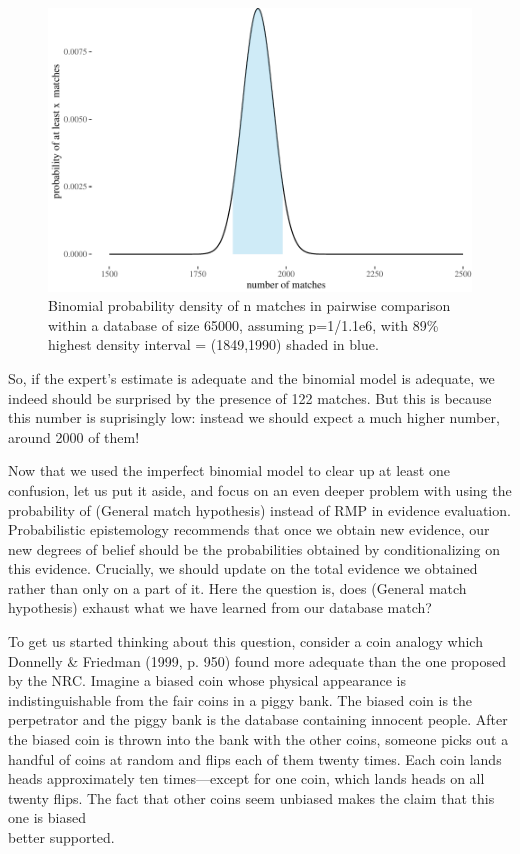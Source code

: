 \documentclass[10pt,dvipsnames,enabledeprecatedfontcommands]{scrartcl}
\begin{document}
\begin{figure}

{\centering \includegraphics[width=1\linewidth]{lr-chapter_files/figure-latex/unnamed-chunk-9-1} 

}

\caption{Binomial probability density of  n matches in pairwise comparison within a database of size 65000, assuming p=1/1.1e6, with 89\% highest density interval = (1849,1990) shaded in blue.}\label{fig:unnamed-chunk-9}
\end{figure}

So, if the expert's estimate is adequate and the binomial model is
adequate, we indeed should be surprised by the presence of 122 matches.
But this is because this number is suprisingly low: instead we should
expect a much higher number, around 2000 of them!

Now that we used the imperfect binomial model to clear up at least one
confusion, let us put it aside, and focus on an even deeper problem with
using the probability of (General match hypothesis) instead of RMP in
evidence evaluation. Probabilistic epistemology recommends that once we
obtain new evidence, our new degrees of belief should be the
probabilities obtained by conditionalizing on this evidence. Crucially,
we should update on the total evidence we obtained rather than only on a
part of it. Here the question is, does (General match hypothesis)
exhaust what we have learned from our database match?

To get us started thinking about this question, consider a coin analogy
which Donnelly \& Friedman (1999, p. 950) found more adequate than the
one proposed by the NRC. Imagine a biased coin whose physical appearance
is indistinguishable from the fair coins in a piggy bank. The biased
coin is the perpetrator and the piggy bank is the database containing
innocent people. After the biased coin is thrown into the bank with the
other coins, someone picks out a handful of coins at random and flips
each of them twenty times. Each coin lands heads approximately ten
times---except for one coin, which lands heads on all twenty flips. The
fact that other coins seem unbiased makes the claim that this one is
biased\\
better supported.
\end{document}

